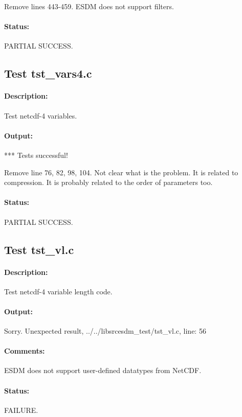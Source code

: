 Remove lines 443-459. ESDM does not support filters.

\paragraph{Status:} PARTIAL SUCCESS.

\subsection{Test tst\_vars4.c}

\paragraph{Description:} Test netcdf-4 variables.

\paragraph{Output:} *** Tests successful!

Remove line 76, 82, 98, 104. Not clear what is the problem. It is related to compression. It is probably related to the order of parameters too.

\paragraph{Status:} PARTIAL SUCCESS.

\subsection{Test tst\_vl.c}

\paragraph{Description:} Test netcdf-4 variable length code.

\paragraph{Output:} Sorry. Unexpected result, ../../libsrcesdm\_test/tst\_vl.c, line: 56

\paragraph{Comments:} ESDM does not support user-defined datatypes from NetCDF.

\paragraph{Status:} FAILURE.

